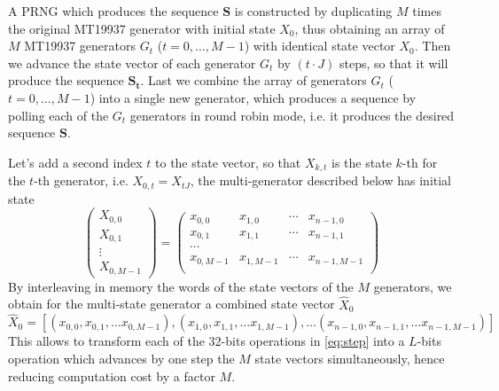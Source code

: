 \documentclass[preprint,1p,times]{elsarticle}
\begin{document}
	A PRNG which produces the sequence $\boldsymbol{S}$ is constructed by duplicating $M$ times the original MT19937 generator with initial state $X_0$, thus obtaining an array of $M$ MT19937 generators $G_t$ ($t=0,\dots, M-1$) with identical state vector $X_0$. Then we advance the state vector of each generator $G_t$ by $(t\cdot J)$ steps, so that it will produce the sequence $\boldsymbol{S_t}$. Last we combine the array of generators $G_t$ ($t=0,\dots, M-1$) into a single new generator, which produces a sequence by polling each of the $G_t$ generators in round robin mode, i.e. it produces the desired sequence $\boldsymbol{S}$.
	
	Let's add a second index $t$ to the state vector, so that $X_{k,t}$ is the state $k$-th for the $t$-th generator, i.e. $X_{0,t}=X_{tJ}$, the multi-generator described below has initial state
	$$
	\begin{pmatrix}
		X_{0,0} \\ X_{0,1} \\ \vdots \\ X_{0,M-1}
	\end{pmatrix}
	= 
	\begin{pmatrix}
		x_{0,0} & x_{1,0} & \cdots & x_{n-1,0} \\
		x_{0,1} & x_{1,1} & \cdots & x_{n-1,1} \\
		\cdots \\
		x_{0,M-1} & x_{1,M-1} & \cdots & x_{n-1,M-1} \\
	\end{pmatrix}
	$$
	By interleaving in memory the words of the state vectors of the $M$ generators, we obtain for the multi-state generator a combined state vector $\hat{X}_0$
	$$
	\hat{X}_0 = [(x_{0,0}, x_{0,1}, \dots x_{0,M-1}), (x_{1,0}, x_{1,1}, \dots x_{1,M-1}), \dots (x_{n-1,0}, x_{n-1,1}, \dots x_{n-1,M-1})]
	$$
	This allows to transform each of the 32-bits operations in \eqref{eq:step} into a $L$-bits operation which advances by one step the $M$ state vectors simultaneously, hence reducing computation cost by a factor $M$.
\end{document}
